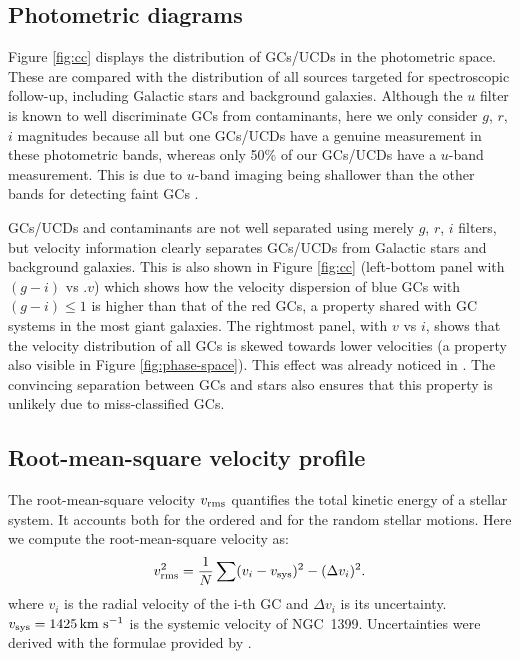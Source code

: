 \documentclass[useAMS,usenatbib]{mn2e}
\newcommand{\kms}{\mbox{\,km~s$^{-1}$}}
\begin{document}
\subsection{Photometric diagrams}


Figure \ref{fig:cc} displays the distribution of GCs/UCDs in the photometric space. These are compared with the distribution of all sources targeted for spectroscopic follow-up, including Galactic stars and background galaxies. Although the $u$ filter is known to well discriminate GCs from contaminants, here we only consider $g$, $r$, $i$ magnitudes because all but one GCs/UCDs have a genuine measurement in these photometric bands, whereas only 50\% of our GCs/UCDs have a $u$-band measurement. This is due to $u$-band imaging being shallower than the other bands for detecting faint GCs \citep{DAbrusco16}.

GCs/UCDs and contaminants are not well separated using merely $g$, $r$, $i$ filters, but velocity information clearly separates GCs/UCDs from Galactic stars and background galaxies. This is also shown in Figure \ref{fig:cc} (left-bottom panel with $(g-i)$ vs .$v$) which shows how the velocity dispersion of blue GCs with $(g-i) \le 1$ is higher than that of the red GCs, a property shared with GC systems in the most giant galaxies. The rightmost panel, with $v$ vs $i$, shows that the velocity distribution of all GCs is skewed towards lower velocities (a property also visible in Figure \ref{fig:phase-space}). This effect was already noticed in \citet{Schuberth}. The convincing separation between GCs and stars also ensures that this property is unlikely due to miss-classified GCs. 

\subsection{Root-mean-square velocity profile}
The root-mean-square velocity $v_{\rm rms}$ quantifies the total kinetic energy of a stellar system. It accounts both for the ordered and for the random stellar motions. Here we compute the root-mean-square velocity as:
\begin{equation}
v_{\rm rms}^2 = \frac{1}{N}  \sum (v_i - v_{\rm sys})^2 - (\Delta v_i)^2 .
\label{eq:sigma}
\end{equation}
where $v_i$ is the radial velocity of the i-th GC and $\Delta v_i$ is its uncertainty. $v_{\rm sys}=1425 \kms$ is the systemic velocity of NGC~1399. Uncertainties were derived with the formulae provided by \citet{Danese}. 
\end{document}
